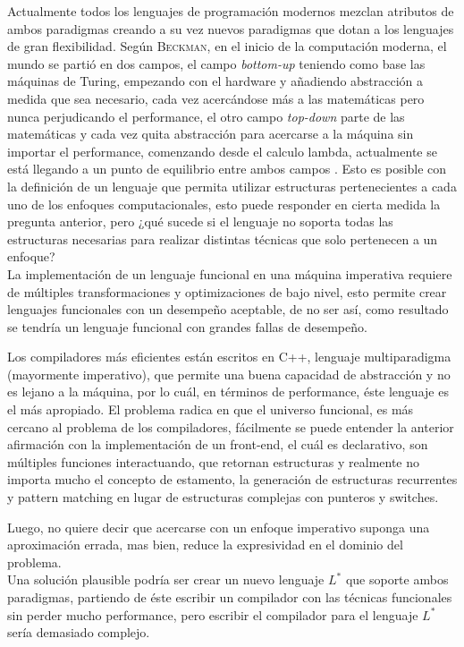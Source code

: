 Actualmente todos los lenguajes de programación modernos mezclan atributos de ambos paradigmas creando a su vez nuevos paradigmas que dotan a los lenguajes de gran flexibilidad. Según \textsc{Beckman}, en el inicio de la computación moderna, el mundo se partió en dos campos, el campo \emph{bottom-up} teniendo como base las máquinas de Turing, empezando con el hardware y añadiendo abstracción a medida que sea necesario, cada vez acercándose más a las matemáticas pero nunca perjudicando el performance, el otro campo \emph{top-down} parte de las matemáticas y cada vez quita abstracción para acercarse a la máquina sin importar el performance, comenzando desde el calculo lambda, actualmente se está llegando a un punto de equilibrio entre ambos campos \cite{Beckman2007}  . Esto es posible con la definición de un lenguaje que permita utilizar estructuras pertenecientes a cada uno de los enfoques computacionales, esto puede responder en cierta medida la pregunta anterior, pero ¿qué sucede si el lenguaje no soporta todas las estructuras necesarias para realizar distintas técnicas que solo pertenecen a un enfoque?\\

La implementación de un lenguaje funcional en una máquina imperativa requiere de múltiples transformaciones y optimizaciones de bajo nivel, esto permite crear lenguajes funcionales con un desempeño aceptable, de no ser así, como resultado se tendría un lenguaje funcional con grandes fallas de desempeño.

Los compiladores más eficientes están escritos en C++, lenguaje multiparadigma (mayormente imperativo), que permite una buena capacidad de abstracción y no es lejano a la máquina, por lo cuál, en términos de performance, éste lenguaje es el más apropiado. El problema radica en que el universo funcional, es más cercano al problema de los compiladores, fácilmente se puede entender la anterior afirmación con la implementación de un front-end, el cuál es declarativo, son múltiples funciones interactuando, que retornan estructuras y realmente no importa mucho el concepto de estamento, la generación de estructuras recurrentes y pattern matching en lugar de estructuras complejas con punteros y switches.

Luego, no quiere decir que acercarse con un enfoque imperativo suponga una aproximación errada, mas bien, reduce la expresividad en el dominio del problema.\\

Una solución plausible podría ser crear un nuevo lenguaje $L^*$ que soporte ambos paradigmas, partiendo de éste escribir un compilador con las técnicas funcionales sin perder mucho performance, pero escribir el compilador para el lenguaje $L^*$ sería demasiado complejo.



